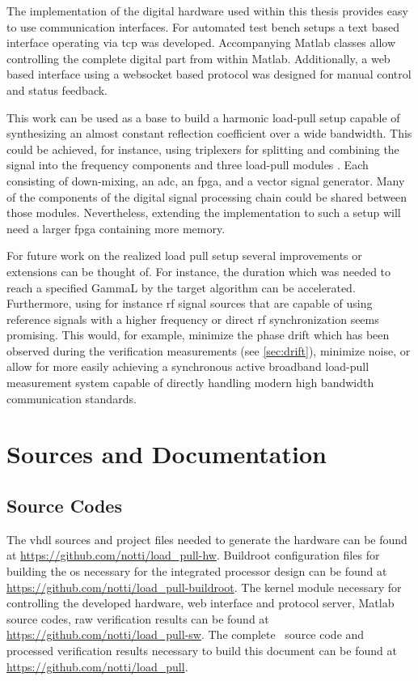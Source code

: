\documentclass[12pt,a4paper,parskip=full,abstract=true,BCOR=12mm]{scrreprt}
\begin{document}
The implementation of the digital hardware used within this thesis provides
easy to use communication interfaces. For automated test bench setups a text based
interface operating via \gls{tcp} was developed. Accompanying Matlab classes
allow controlling the complete digital part from within Matlab. Additionally,
a web based interface using a websocket based protocol was designed for
manual control and status feedback.

This work can be used as a base to build a harmonic load-pull setup capable
of synthesizing an almost constant reflection coefficient over a wide bandwidth. This
could be achieved, for instance, using triplexers for splitting and combining the signal into
the frequency components and three load-pull modules \cite{hashmi_accurate_2010}. Each consisting of down-mixing, an
\gls{adc}, an \gls{fpga}, and a vector signal generator. Many of the components
of the digital signal processing chain could be shared between those
modules. Nevertheless, extending the implementation to such a setup will need a
larger \gls{fpga} containing more memory.

For future work on the realized load pull setup several improvements or extensions
can be thought of. For instance, the duration which was needed to reach a specified \gls{GammaL}
by the target algorithm can be accelerated. Furthermore, using for instance \gls{rf}
signal sources that are capable of using reference signals with a higher frequency
or direct \gls{rf} synchronization seems promising. This would, for example,
minimize the phase drift which has been observed during the verification measurements (see \cref{sec:drift}),
minimize noise, or allow for more easily achieving a synchronous active broadband
load-pull measurement system capable of directly handling modern high
bandwidth communication standards.


\appendix
\chapter{Sources and Documentation}
\section{Source Codes}
\label{sec:sources}

The \gls{vhdl} sources and project files needed to generate the hardware can be found at
\url{https://github.com/notti/load_pull-hw}. Buildroot configuration files for building
the \gls{os} necessary for the integrated processor design can be found at
\url{https://github.com/notti/load_pull-buildroot}. The kernel module necessary for controlling
the developed hardware, web interface and protocol server, Matlab source codes, raw verification results
can be found at \url{https://github.com/notti/load_pull-sw}. The complete \LuaLaTeX~source code
and processed verification results necessary to build this document can be found at
\url{https://github.com/notti/load_pull}.
\end{document}
